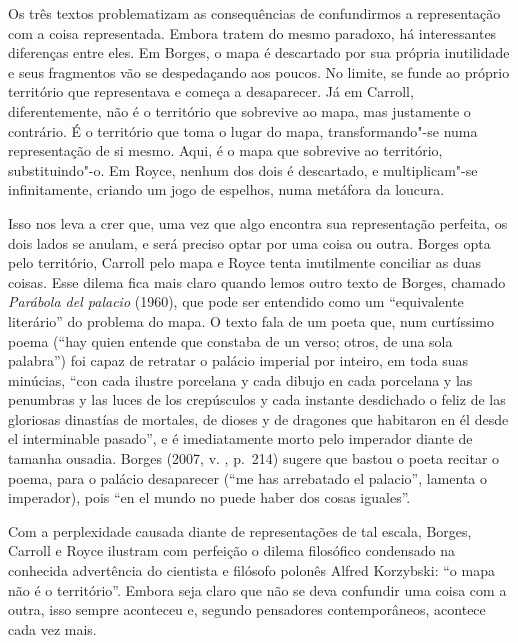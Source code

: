 Os três textos problematizam as consequências de confundirmos a
representação com a coisa representada. Embora tratem do mesmo paradoxo,
há interessantes diferenças entre eles. Em Borges, o mapa é descartado
por sua própria inutilidade e seus fragmentos vão se despedaçando aos
poucos. No limite, se funde ao próprio território que representava e
começa a desaparecer. Já em Carroll, diferentemente, não é o território
que sobrevive ao mapa, mas justamente o contrário. É o território que
toma o lugar do mapa, transformando"-se numa representação de si
mesmo. Aqui, é o mapa que sobrevive ao território, substituindo"-o. Em
Royce, nenhum dos dois é descartado, e multiplicam"-se infinitamente,
criando um jogo de espelhos, numa metáfora da loucura.

Isso nos leva a crer que, uma vez que algo encontra sua representação
perfeita, os dois lados se anulam, e será preciso optar por uma coisa ou
outra. Borges opta pelo território, Carroll pelo mapa e Royce tenta
inutilmente conciliar as duas coisas. Esse dilema fica mais claro quando
lemos outro texto de Borges, chamado \emph{Parábola del palacio} (1960),
que pode ser entendido como um ``equivalente literário'' do problema do
mapa. O texto fala de um poeta que, num curtíssimo poema (``hay quien
entende que constaba de un verso; otros, de una sola palabra'') foi
capaz de retratar o palácio imperial por inteiro, em toda suas minúcias,
``con cada ilustre porcelana y cada dibujo en cada porcelana y las
penumbras y las luces de los crepúsculos y cada instante desdichado o
feliz de las gloriosas dinastías de mortales, de dioses y de dragones
que habitaron en él desde el interminable pasado'', e é imediatamente
morto pelo imperador diante de tamanha ousadia. Borges (2007, v. , p.~214) sugere que bastou o poeta recitar o poema, para o palácio
desaparecer (``me has arrebatado el palacio'', lamenta o imperador),
pois ``en el mundo no puede haber dos cosas iguales''.

Com a perplexidade causada diante de representações de tal
escala, Borges, Carroll e Royce ilustram com perfeição o dilema
filosófico condensado na conhecida advertência do cientista e filósofo
polonês Alfred Korzybski: ``o mapa não é o território''. Embora seja
claro que não se deva confundir uma coisa com a outra, isso sempre
aconteceu e, segundo pensadores contemporâneos, acontece cada vez mais.

